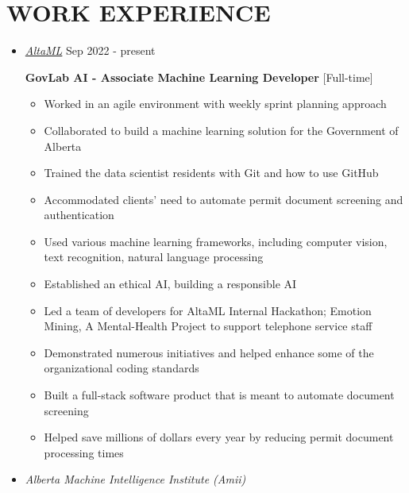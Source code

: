 \documentclass[10pt,a4paper,sans]{moderncv} %
\begin{document}
	\section{WORK EXPERIENCE}
	\begin{itemize}
		\item \href{http://altaml.com/}{ \emph{\large AltaML}} \hfill Sep 2022 - present
		\vspace{0.25cm}
		
		\textbf{GovLab AI - Associate Machine Learning Developer} [Full-time]
		
		\begin{itemize}
			\item Worked in an agile environment with weekly sprint planning approach
			\item Collaborated to build a machine learning solution for the Government of Alberta
			\item Trained the data scientist residents with Git and how to use GitHub
			\item Accommodated clients' need to automate permit document screening and authentication
			\item Used various machine learning frameworks, including computer vision, text recognition, natural language processing
			\item Established an ethical AI, building a responsible AI
			\item Led a team of developers for AltaML Internal Hackathon; Emotion Mining, A Mental-Health Project to support telephone service staff
			\item Demonstrated numerous initiatives and helped enhance some of the organizational coding standards
			\item Built a full-stack software product that is meant to automate document screening
			\item Helped save millions of dollars every year by reducing permit document processing times
		\end{itemize}
		
\vspace{0.5cm}
		\item \href{https://amii.ca/}{} \emph{\large Alberta Machine Intelligence Institute (Amii)}
		\vspace{0.25cm}
		

\end{itemize}
\end{document}
